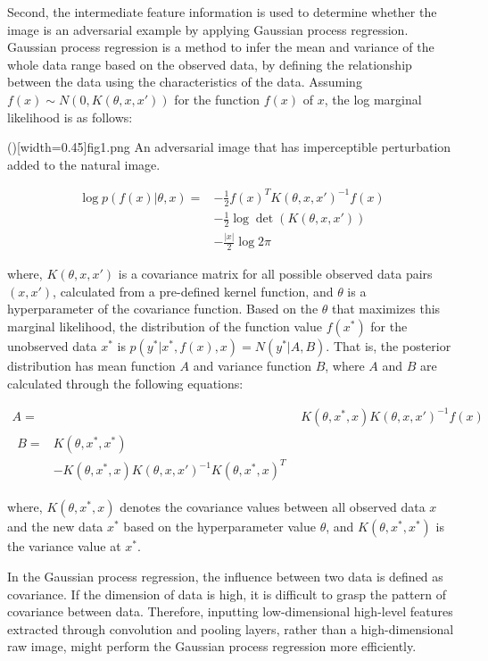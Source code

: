 \documentclass{ieeeaccess}
\begin{document}
Second, the intermediate feature information is used to determine whether the image is an adversarial example by applying Gaussian process regression. 
Gaussian process regression is a method to infer the mean and variance of the whole data range based on the observed data, by defining the relationship between the data using the characteristics of the data.
Assuming $f(x)\sim N(0,K(\theta,x,x'))$ for the function $f(x)$ of $x$, the log marginal likelihood is as follows:

\Figure[t]()[width=0.45\textwidth]{fig1.png}
   {An adversarial image that has imperceptible perturbation added to the natural image.\label{fig1}}

\begin{equation}
	\begin{split}
		\log p(f(x)|\theta,x) = &-{\frac{1}{2}}f(x)^{T}K(\theta,x,x')^{-1}f(x) \\
		&-{\frac{1}{2}}\log{\det(K(\theta,x,x'))} \\
		&-{\frac{|x|}{2}}\log{2\pi}
	\end{split}
\end{equation}

where, $K(\theta,x,x')$ is a covariance matrix for all possible observed data pairs $(x,x')$, calculated from a pre-defined kernel function, and $\theta$ is a hyperparameter of the covariance function. 
Based on the $\theta$ that maximizes this marginal likelihood, the distribution of the function value $f(x^\ast)$ for the unobserved data $x^\ast$ is $p(y^\ast|x^\ast,f(x),x)=N(y^\ast|A,B)$. 
That is, the posterior distribution has mean function $A$ and variance function $B$, where $A$ and $B$ are calculated through the following equations:

\begin{align}
	A = & K(\theta,x^\ast,x)K(\theta,x,x')^{-1}f(x) \\
	\begin{split}
		B = & K(\theta,x^\ast,x^\ast) \\
		&-K(\theta,x^\ast,x)K(\theta,x,x')^{-1}K(\theta,x^\ast,x)^{T}
	\end{split}
\end{align}

where, $K(\theta,x^\ast,x)$ denotes the covariance values between all observed data $x$ and the new data $x^\ast$ based on the hyperparameter value $\theta$, and $K(\theta,x^\ast,x^\ast)$ is the variance value at $x^\ast$. 

In the Gaussian process regression, the influence between two data is defined as covariance. If the dimension of data is high, it is difficult to grasp the pattern of covariance between data. 
Therefore, inputting low-dimensional high-level features extracted through convolution and pooling layers, rather than a high-dimensional raw image, might perform the Gaussian process regression more efficiently.
\end{document}
